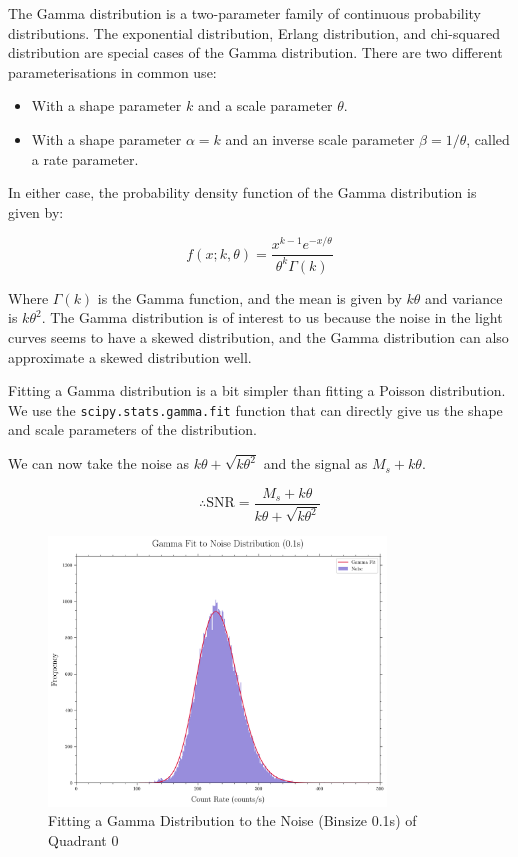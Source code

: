 \documentclass[11pt]{book} %
\begin{document}
The Gamma distribution is a two-parameter family of continuous probability distributions. The exponential distribution, Erlang distribution, and chi-squared distribution are special cases of the Gamma distribution. There are two different parameterisations in common use:

\begin{itemize}
    \item With a shape parameter $k$ and a scale parameter $\theta$.
    \item With a shape parameter $\alpha = k$ and an inverse scale parameter $\beta = 1/\theta$, called a rate parameter.
\end{itemize}

In either case, the probability density function of the Gamma distribution is given by:

\begin{equation} \label{eq:Gamma}
    f(x; k, \theta) = \frac{x^{k-1}e^{-x/\theta}}{\theta^k\Gamma(k)}
\end{equation}
    
    Where $\Gamma(k)$ is the Gamma function, and the mean is given by $k\theta$ and variance is $k\theta^2$. The Gamma distribution is of interest to us because the noise in the light curves seems to have a skewed distribution, and the Gamma distribution can also approximate a skewed distribution well.

Fitting a Gamma distribution is a bit simpler than fitting a Poisson distribution. We use the \lstinline[language=Python]{scipy.stats.gamma.fit} function that can directly give us the shape and scale parameters of the distribution.

We can now take the noise as $k\theta + \sqrt{k\theta^2}$ and the signal as $M_s+k\theta$.

\begin{equation}
    \therefore \text{SNR} = \frac{M_s+k\theta}{k\theta + \sqrt{k\theta^2}}
\end{equation}

\begin{figure}[H]
    \centering
    \includegraphics[width=0.8\textwidth]{Pictures/gamma_fit.png}
    \caption{Fitting a Gamma Distribution to the Noise (Binsize 0.1s) of Quadrant 0}
\end{figure}
\end{document}
